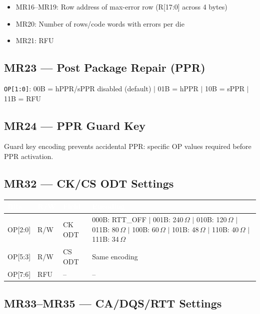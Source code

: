 \documentclass[10pt,a4paper,twoside]{article}
\newcommand{\thd}[1]{\cellcolor{navyblue}\textcolor{white}{\textbf{#1}}}
\newcommand{\trow}{\rowcolor{lightgray}}
\newcommand{\talt}{\rowcolor{skyblue!30}}
\begin{document}
\begin{itemize}
  \item MR16--MR19: Row address of max-error row (R[17:0] across 4 bytes)
  \item MR20: Number of rows/code words with errors per die
  \item MR21: RFU
\end{itemize}

\subsection{MR23 --- Post Package Repair (PPR)}

\texttt{OP[1:0]}: 00B = hPPR/sPPR disabled (default) $|$ 01B = hPPR $|$ 10B = sPPR $|$ 11B = RFU

\subsection{MR24 --- PPR Guard Key}

Guard key encoding prevents accidental PPR: specific OP values required before PPR activation.

\subsection{MR32 --- CK/CS ODT Settings}

\begin{center}
\begin{tabularx}{\linewidth}{@{} l l l X @{}}
\toprule
\thd{Bits} & \thd{R/W} & \thd{Field} & \thd{Encoding} \\
\midrule
\trow OP[2:0] & R/W & CK ODT &
  000B: RTT\_OFF $|$ 001B: 240\,$\Omega$ $|$ 010B: 120\,$\Omega$ $|$ 011B: 80\,$\Omega$ $|$
  100B: 60\,$\Omega$ $|$ 101B: 48\,$\Omega$ $|$ 110B: 40\,$\Omega$ $|$ 111B: 34\,$\Omega$ \\
\talt OP[5:3] & R/W & CS ODT & Same encoding \\
\trow OP[7:6] & RFU & -- & -- \\
\bottomrule
\end{tabularx}
\end{center}

\subsection{MR33--MR35 --- CA/DQS/RTT Settings}
\end{document}
